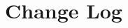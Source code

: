 \documentclass[9pt, openany]{extbook}
\begin{document}










\appendix

\chapter{Change Log}
\label{changelog}
\end{document}
